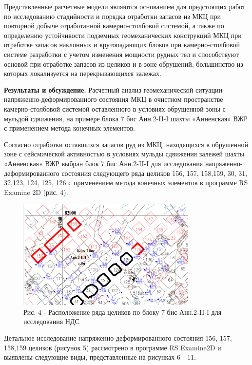 Представленные расчетные модели являются основанием для предстоящих
работ по исследованию стадийности и порядка отработки запасов из МКЦ при
повторной добыче отработанной камерно-столбовой системой, а также по
определению устойчивости подземных геомеханических конструкций МКЦ при
отработке запасов наклонных и крутопадающих блоков при камерно-столбовой
системе разработки с учетом изменения мощности рудных тел и способствуют
основой при отработке запасов из целиков и в зоне обрушений, большинство
из которых локализуется на перекрывающихся залежах.

{\bfseries Результаты и обсуждение.} Расчетный анализ геомеханической
ситуации напряженно-деформированного состояния МКЦ в очистном
пространстве камерно-столбовой системой оставленного в условиях
обрушенной зоны с мульдой сдвижения, на примере блока 7 бис Анн.2-II-I
шахты «Анненская» ВЖР с применением метода конечных элементов.

Согласно отработки оставшихся запасов руд из МКЦ, находящихся в
обрушенной зоне с сейсмической активностью в условиях мульды сдвижения
залежей шахты «Анненская» ВЖР выбран блок 7 бис Анн.2-II-I для
исследования напряженно-деформированного состояния следующего ряда
целиков 156, 157, 158,159, 30, 31, 32,123, 124, 125, 126 с применением
метода конечных элементов в программе RS Examine 2D (рис. 4).

\begin{figure}[H]
	\centering
	\includegraphics[width=0.8\textwidth]{media/gor/image9}
	\caption*{Рис. 4 - Расположение ряда целиков по блоку 7 бис Анн.2-II-I для
	исследования НДС}
\end{figure}



Детальное исследование напряженно-деформированного состояния 156, 157,
158,159 целиков (рисунок 5) рассмотрено в программе RS Examine2D и
выявлены следующие виды, представленные на рисунках 6 - 11.

